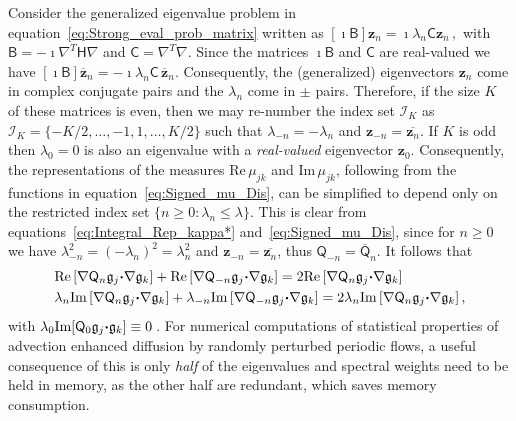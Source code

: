 \documentclass[english,12pt,jmp,graphicx]{revtex4-1}
\newcommand{\vecz}{\boldsymbol{z}}
\newcommand{\vecg}{\mathfrak{g}}
\newcommand{\bcdot}{\mbox{\boldmath${\cdot}$}}
\newcommand{\Real}{\mbox{Re}\,}
\newcommand{\Imag}{\mbox{Im}\,}
\newcommand{\Hm}{\mathsf{H}}
\newcommand{\Bm}{\mathsf{B}}
\newcommand{\Cm}{\mathsf{C}}
\newcommand{\Qm}{\mathsf{Q}}
\begin{document}
Consider the generalized eigenvalue problem in
equation~\eqref{eq:Strong_eval_prob_matrix} written as 
$[\imath\Bm]\vecz_n=\imath\lambda_n\Cm\vecz_n\,,$ with 
$\Bm=-\imath\nabla^T\Hm\nabla$ and $\Cm=\nabla^T\nabla$. Since the
matrices $\imath\Bm$ and $\Cm$ are real-valued we have
$[\imath\Bm]\overline{\vecz}_n=-\imath\lambda_n\Cm\,\overline{\vecz}_n$.
Consequently, the (generalized) eigenvectors $\vecz_n$ come in complex
conjugate pairs and the $\lambda_n$ come in $\pm$ pairs. Therefore, if the size 
$K$ of these matrices is even, then we may re-number the index set
$\mathcal{I}_K$ as $\mathcal{I}_K=\{-K/2,\ldots,-1,1,\ldots ,K/2\}$ such that
$\lambda_{-n}=-\lambda_n$ and
$\vecz_{-n}=\overline{\vecz_n}$. If $K$ is odd then $\lambda_0=0$ is
also an eigenvalue with a \emph{real-valued} eigenvector
$\vecz_0$. Consequently, 
the representations of the measures $\Real\mu_{jk}$ and $\Imag\mu_{jk}$,
following from the functions in equation~\eqref{eq:Signed_mu_Dis},
can be simplified \cite{Pavliotis:PHD_Thesis} to depend only
on the restricted index set $\{n\geq0:\lambda_n\leq\lambda\}$. This is clear from
equations~\eqref{eq:Integral_Rep_kappa*} and~\eqref{eq:Signed_mu_Dis}, 
since for $n\geq0$ we have $\lambda_{-n}^2=(-\lambda_n)^2=\lambda_n^2$ and
$\vecz_{-n}=\overline{\vecz_n}$, thus
$\Qm_{-n}=\overline{\Qm}_n$. It follows that
%
\begin{align}\label{eq:Real_Spectral}
  &\Real[\nabla\Qm_n\vecg_j\bcdot\nabla\vecg_k]
  +\Real[\nabla\Qm_{-n}\vecg_j\bcdot\nabla\vecg_k] 
  =2\Real[\nabla\Qm_n\vecg_j\bcdot\nabla\vecg_k]
  \\
  &\lambda_n\Imag[\nabla\Qm_n\vecg_j\bcdot\nabla\vecg_k]
  +\lambda_{-n}\Imag[\nabla\Qm_{-n}\vecg_j\bcdot\nabla\vecg_k]
  =2\lambda_n\Imag[\nabla\Qm_n\vecg_j\bcdot\nabla\vecg_k]\,,
  \notag
\end{align}
%
with $\lambda_0\text{Im}[\Qm_0\vecg_j\bcdot\vecg_k]\equiv0\,$. For
numerical computations of statistical properties of advection enhanced
diffusion by randomly perturbed periodic flows, a useful consequence
of this is only \emph{half} of the eigenvalues and spectral weights
need to be held in memory, as the other half are redundant, which
saves memory consumption.



\end{document}
